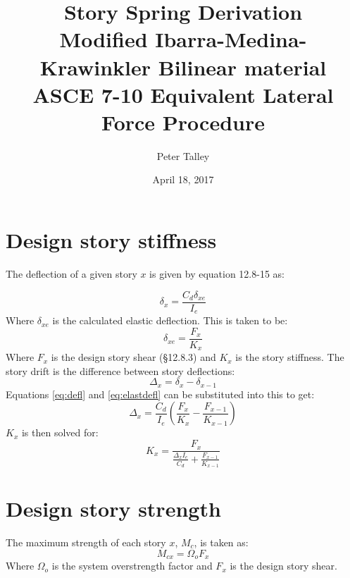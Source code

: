 \documentclass[11pt,letterpaper]{article}
\title{Story Spring Derivation \\
       \vspace{0.5em}
       \large Modified Ibarra-Medina-Krawinkler Bilinear material\\
       \vspace{0.5em}
       \large ASCE 7-10 Equivalent Lateral Force Procedure}
\author{Peter Talley}
\date{April 18, 2017}
\begin{document}
\maketitle

\section{Design story stiffness}
The deflection of a given story $x$ is given by equation 12.8-15 as:

\begin{equation} \label{eq:defl}
    \delta_x = \frac{C_d \delta_{xe}}{I_e}
\end{equation}
Where $\delta_{xe}$ is the calculated elastic deflection. This is taken to be:
\begin{equation} \label{eq:elastdefl}
	\delta_{xe} = \frac{F_x}{K_x}
\end{equation}
Where $F_x$ is the design story shear (\S 12.8.3) and $K_x$ is the story stiffness. The story drift is the difference between story deflections:
\begin{equation} \label{eq:drift}
	\Delta_x = \delta_x - \delta_{x-1}
\end{equation}
Equations \eqref{eq:defl} and \eqref{eq:elastdefl} can be substituted into this to get:
\begin{equation} \label{eq:driftsubs}
	\Delta_x = \frac{C_d}{I_e} \left(\frac{F_x}{K_x} - \frac{F_{x-1}}{K_{x-1}}\right)
\end{equation}
$K_x$ is then solved for:
\begin{equation} \label{eq:stiffness}
    K_x = \frac{F_x}{\frac{\Delta_x I_e}{C_d} + \frac{F_{x-1}}{K_{x-1}}}
\end{equation}

\section{Design story strength}
The maximum strength of each story $x$, $M_c$, is taken as:
\begin{equation}
  M_{cx} = Ω_o F_x
\end{equation}
Where $Ω_o$ is the system overstrength factor and $F_x$ is the design story shear.
\end{document}
